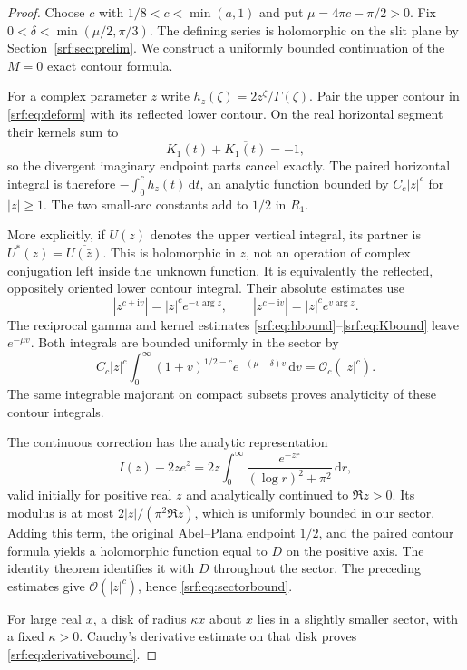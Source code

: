 \documentclass[11pt]{article}
\theoremstyle{remark}\newtheorem{remark}[theorem]{Remark}
\newcommand{\OO}{\mathcal O}
\newcommand{\ii}{\mathrm i}
\newcommand{\dd}{\,\mathrm d}
\begin{document}
\begin{proof}
Choose $c$ with $1/8<c<\min(a,1)$ and put $\mu=4\pi c-\pi/2>0$. Fix $0<\delta<\min(\mu/2,\pi/3)$. The defining series is holomorphic on the slit plane by Section~\ref{srf:sec:prelim}. We construct a uniformly bounded continuation of the $M=0$ exact contour formula.

For a complex parameter $z$ write $h_z(\zeta)=2z^\zeta/\Gamma(\zeta)$. Pair the upper contour in \eqref{srf:eq:deform} with its reflected lower contour. On the real horizontal segment their kernels sum to
\[
 K_1(t)+\overline{K_1(t)}=-1,
\]
so the divergent imaginary endpoint parts cancel exactly. The paired horizontal integral is therefore $-\int_0^c h_z(t)\dd t$, an analytic function bounded by $C_c|z|^c$ for $|z|\ge1$. The two small-arc constants add to $1/2$ in $R_1$.

More explicitly, if $U(z)$ denotes the upper vertical integral, its partner is $U^*(z)=\overline{U(\bar z)}$. This is holomorphic in $z$, not an operation of complex conjugation left inside the unknown function. It is equivalently the reflected, oppositely oriented lower contour integral. Their absolute estimates use
\[
 |z^{c+\ii v}|=|z|^ce^{-v\arg z},\qquad
 |z^{c-\ii v}|=|z|^ce^{v\arg z}.
\]
The reciprocal gamma and kernel estimates \eqref{srf:eq:hbound}--\eqref{srf:eq:Kbound} leave $e^{-\mu v}$. Both integrals are bounded uniformly in the sector by
\[
 C_c|z|^c\int_0^\infty
         (1+v)^{1/2-c}e^{-(\mu-\delta)v}\dd v
       =\OO_c(|z|^c).
\]
The same integrable majorant on compact subsets proves analyticity of these contour integrals.

The continuous correction has the analytic representation
\[
 I(z)-2ze^z=2z\int_0^\infty
            \frac{e^{-zr}}{(\log r)^2+\pi^2}\dd r,
\]
valid initially for positive real $z$ and analytically continued to $\Re z>0$. Its modulus is at most $2|z|/(\pi^2\Re z)$, which is uniformly bounded in our sector. Adding this term, the original Abel--Plana endpoint $1/2$, and the paired contour formula yields a holomorphic function equal to $D$ on the positive axis. The identity theorem identifies it with $D$ throughout the sector. The preceding estimates give $\OO(|z|^c)$, hence \eqref{srf:eq:sectorbound}.

For large real $x$, a disk of radius $\kappa x$ about $x$ lies in a slightly smaller sector, with a fixed $\kappa>0$. Cauchy's derivative estimate on that disk proves \eqref{srf:eq:derivativebound}.
\end{proof}
\end{document}
